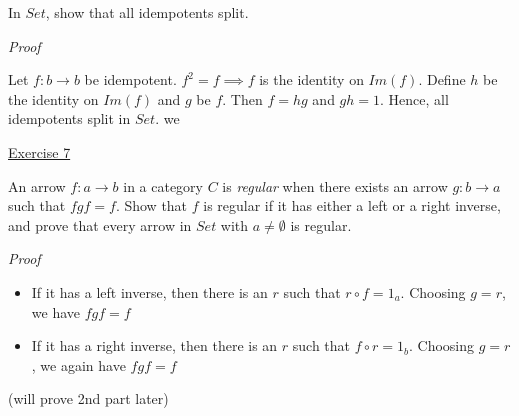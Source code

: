 \documentclass[11pt]{article}
\begin{document}
In $Set$, show that all idempotents split.

\vspace{2mm}
\noindent
\emph{Proof}

Let $f : b \to b$ be idempotent. $f^2 = f \implies f$ is the identity on $Im(f)$. Define $h$ be the identity on $Im(f)$ and $g$ be $f$. Then $f = hg$ and $gh = 1$. Hence, all idempotents split in $Set$.
 we

\vspace{2mm}
\noindent
\underline{Exercise 7}
\vspace{2mm}

An arrow $f: a \to b$ in a category $C$ is \emph{regular} when there exists an arrow $g: b \to a$
such that $f g f = f$. Show that $f$ is regular if it has either a left or a right inverse,
and prove that every arrow in $Set$ with $a \neq \emptyset$ is regular.

\vspace{2mm}
\noindent
\emph{Proof}

\begin{itemize}
	\item If it has a left inverse, then there is an $r$ such that $r \circ f = 1_a$. Choosing $g = r$, we have $f g f = f$
	\item If it has a right inverse, then there is an $r$ such that $f \circ r = 1_b$. Choosing $g = r$, we again have $f g f = f$
\end{itemize}

(will prove 2nd part later)


\end{document}
